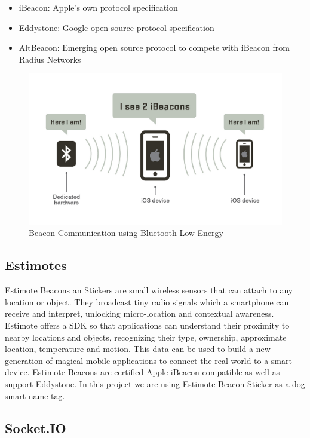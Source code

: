 \documentclass[12pt]{article}
\begin{document}
\begin{itemize}
  \item iBeacon: Apple's own protocol specification
  \item Eddystone: Google open source protocol specification
  \item AltBeacon: Emerging open source protocol to compete with iBeacon from Radius Networks
\end{itemize}


\begin{figure}[!htb]
  \includegraphics[width=\textwidth]{Figures/BeaconCommunication}
  \caption{Beacon Communication using Bluetooth Low Energy}
  \label{fig:BeaconCommunication}
\end{figure}


\subsection{Estimotes}

Estimote Beacons an Stickers are small wireless sensors that can attach to any location or object. They broadcast tiny radio signals which a smartphone can receive and interpret, unlocking micro-location and contextual awareness\cite{Estimote2016}. Estimote offers a SDK so that applications can understand their proximity to nearby locations and objects, recognizing their type, ownership, approximate location, temperature and motion. This data can be used to build a new generation of magical mobile applications to connect the real world to a smart device. Estimote Beacons are certified Apple iBeacon compatible as well as support Eddystone. In this project we are using Estimote Beacon Sticker as a dog smart name tag.

\subsection{Socket.IO}
\end{document}
